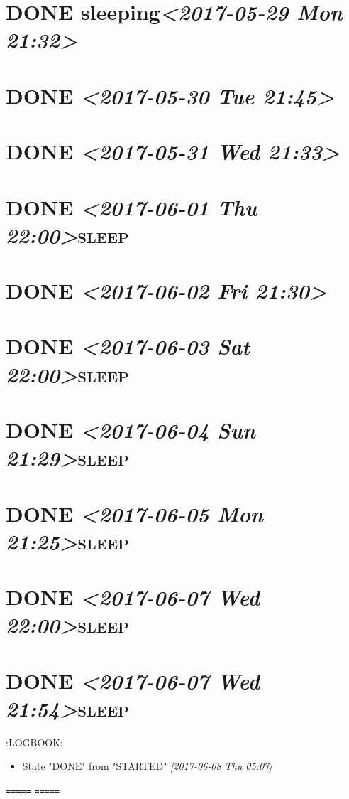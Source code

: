 \documentclass[cyan]{elegantnote}
\begin{document}
\section{{\bfseries\sffamily DONE} sleeping\textit{<2017-05-29 Mon 21:32>}}
\label{sec:org8101393}
\section{{\bfseries\sffamily DONE} \textit{<2017-05-30 Tue 21:45>}}
\label{sec:org43db0a4}
\section{{\bfseries\sffamily DONE} \textit{<2017-05-31 Wed 21:33>}}
\label{sec:orgd5cebac}
\section{{\bfseries\sffamily DONE} \textit{<2017-06-01 Thu 22:00>}\hfill{}\textsc{sleep}}
\label{sec:org5e3258a}
\section{{\bfseries\sffamily DONE} \textit{<2017-06-02 Fri 21:30>}}
\label{sec:org5984ea8}
\section{{\bfseries\sffamily DONE} \textit{<2017-06-03 Sat 22:00>}\hfill{}\textsc{sleep}}
\label{sec:org9106696}
\section{{\bfseries\sffamily DONE} \textit{<2017-06-04 Sun 21:29>}\hfill{}\textsc{sleep}}
\label{sec:org1625437}
\section{{\bfseries\sffamily DONE} \textit{<2017-06-05 Mon 21:25>}\hfill{}\textsc{sleep}}
\label{sec:org1985656}
\section{{\bfseries\sffamily DONE} \textit{<2017-06-07 Wed 22:00>}\hfill{}\textsc{sleep}}
\label{sec:orgcd6dd5f}
\section{{\bfseries\sffamily DONE} \textit{<2017-06-07 Wed 21:54>}\hfill{}\textsc{sleep}}
\label{sec:org68a85bb}
:LOGBOOK:
\begin{itemize}
\item State "DONE"       from "STARTED"    \textit{[2017-06-08 Thu 05:07]}
\end{itemize}
\texttt{=====}
\texttt{=====}
\end{document}
